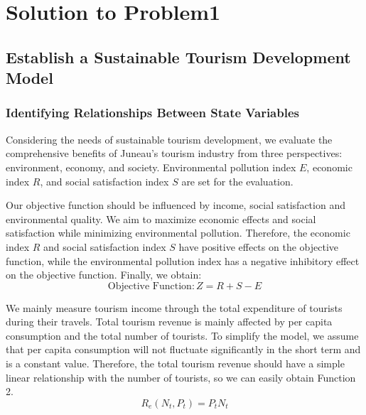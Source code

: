 \documentclass[12pt]{article}  %
\begin{document}
\section{Solution to Problem1}
\subsection{Establish a Sustainable Tourism Development Model}
\subsubsection{Identifying Relationships Between State Variables}
Considering the needs of sustainable tourism development, we evaluate the comprehensive benefits of Juneau's tourism industry from three perspectives: environment, economy, and society. Environmental pollution index $E$, economic index $R$, and social satisfaction index $S$ are set for the evaluation.

Our objective function should be influenced by income, social satisfaction and environmental quality. We aim to maximize economic effects and social satisfaction while minimizing environmental pollution. Therefore, the economic index $R$ and social satisfaction index $S$ have positive effects on the objective function, while the environmental pollution index has a negative inhibitory effect on the objective function. Finally, we obtain:
\begin{equation}
	\text{Objective\ Function}:Z=R+S-E
\end{equation}

We mainly measure tourism income through the total expenditure of tourists during their travels. Total tourism revenue is mainly affected by per capita consumption and the total number of tourists. To simplify the model, we assume that per capita consumption will not fluctuate significantly in the short term and is a constant value. Therefore, the total tourism revenue should have a simple linear relationship with the number of tourists, so we can easily obtain Function 2.
\begin{equation}
    R_{e}(N_{t},P_{t}) = P_{t}N_{t}
\end{equation}
\end{document}
